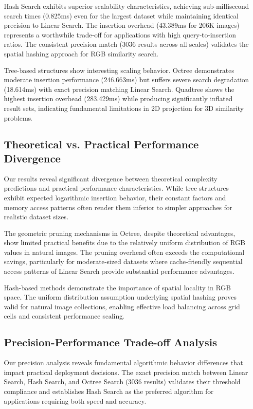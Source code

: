 \documentclass{sbc2023}
\begin{document}
Hash Search exhibits superior scalability characteristics, achieving sub-millisecond search times (0.825ms) even for the largest dataset while maintaining identical precision to Linear Search. The insertion overhead (43.389ms for 206K images) represents a worthwhile trade-off for applications with high query-to-insertion ratios. The consistent precision match (3036 results across all scales) validates the spatial hashing approach for RGB similarity search.

Tree-based structures show interesting scaling behavior. Octree demonstrates moderate insertion performance (246.663ms) but suffers severe search degradation (18.614ms) with exact precision matching Linear Search. Quadtree shows the highest insertion overhead (283.429ms) while producing significantly inflated result sets, indicating fundamental limitations in 2D projection for 3D similarity problems.

\subsection{Theoretical vs. Practical Performance Divergence}

Our results reveal significant divergence between theoretical complexity predictions and practical performance characteristics. While tree structures exhibit expected logarithmic insertion behavior, their constant factors and memory access patterns often render them inferior to simpler approaches for realistic dataset sizes.

The geometric pruning mechanisms in Octree, despite theoretical advantages, show limited practical benefits due to the relatively uniform distribution of RGB values in natural images. The pruning overhead often exceeds the computational savings, particularly for moderate-sized datasets where cache-friendly sequential access patterns of Linear Search provide substantial performance advantages.

Hash-based methods demonstrate the importance of spatial locality in RGB space. The uniform distribution assumption underlying spatial hashing proves valid for natural image collections, enabling effective load balancing across grid cells and consistent performance scaling.

\subsection{Precision-Performance Trade-off Analysis}

Our precision analysis reveals fundamental algorithmic behavior differences that impact practical deployment decisions. The exact precision match between Linear Search, Hash Search, and Octree Search (3036 results) validates their threshold compliance and establishes Hash Search as the preferred algorithm for applications requiring both speed and accuracy.
\end{document}
